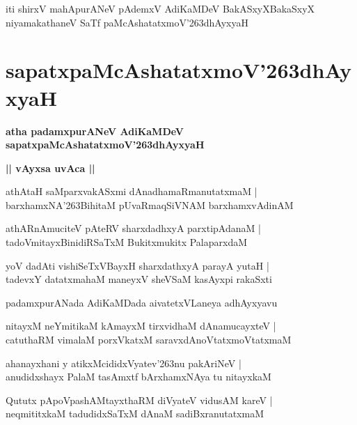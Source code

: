 \documentclass[twoside,12pt,openright]{book}
\def\S{\char'263}
\newcounter{shloka}[chapter]
\def\uvaca#1{\centerline{{\large\textbf{#1}}}}
\begin{document}
\begin{center}
iti shirxV mahApurANeV pAdemxV AdiKaMDeV BakASxyXBakaSxyX niyamakathaneV SaTf paMcAshatatxmoV\S dhAyxyaH
\end{center}
\chapter{sapatxpaMcAshatatxmoV\S dhAyxyaH}

\begin{center}
{\LARGE\bfseries atha padamxpurANeV AdiKaMDeV sapatxpaMcAshatatxmoV\S dhAyxyaH}
\end{center}

\uvaca{|| vAyxsa uvAca ||}

\begin{shloka}
athAtaH saMparxvakASxmi dAnadhamaRmanutatxmaM |\\
barxhamxNA\S BihitaM pUvaRmaqSiVNAM barxhamxvAdinAM 
\end{shloka}

\begin{shloka}
athARnAmuciteV pAteRV sharxdadhxyA parxtipAdanaM |\\
tadoVmitayxBinidiRSaTxM Bukitxmukitx PalaparxdaM 
\end{shloka}

\begin{shloka}
yoV dadAti vishiSeTxVBayxH sharxdathxyA parayA yutaH |\\
tadevxY datatxmahaM maneyxV sheVSaM kasAyxpi rakaSxti
\end{shloka}

\begin{center}
padamxpurANada AdiKaMDada aivatetxVLaneya adhAyxyavu
\end{center}

\begin{shloka}
nitayxM neYmitikaM kAmayxM tirxvidhaM dAnamucayxteV |\\
catuthaRM vimalaM porxVkatxM saravxdAnoVtatxmoVtatxmaM 
\end{shloka}

\begin{shloka}
ahanayxhani y atikxMcididxVyatev\S nu pakAriNeV |\\
anudidxshayx PalaM tasAmxtf bArxhamxNAya tu nitayxkaM 
\end{shloka}

\begin{shloka}
Qututx pApoVpashAMtayxthaRM diVyateV vidusAM kareV |\\
neqmititxkaM tadudidxSaTxM dAnaM sadiBxranutatxmaM 
\end{shloka}
\end{document}
